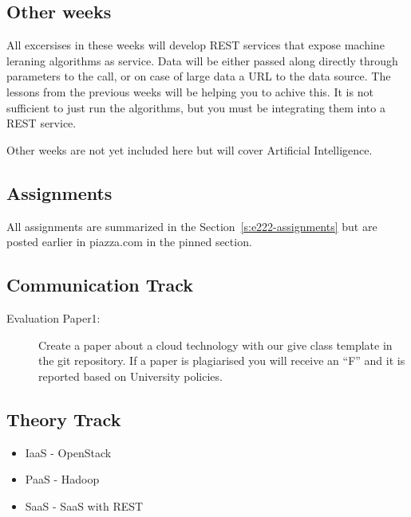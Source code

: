 \subsection{Other weeks}

All excersises in these weeks will develop REST services that expose
machine leraning algorithms as service. Data will be either passed
along directly through parameters to the call, or on case of large
data a URL to the data source. The lessons from the previous weeks
will be helping you to achive this. It is not sufficient to just run
the algorithms, but you must be integrating them into a REST service.

Other weeks are not yet included here but will cover Artificial
Intelligence.

\subsection{Assignments}

All assignments are summarized in the Section~\ref{s:e222-assignments}
but are posted earlier in piazza.com in the pinned section.


\subsection{Communication Track}




\begin{description}
\item[Evaluation Paper1:] Create a paper about a cloud technology with
  our give class template in the git repository. If a paper is
  plagiarised you will receive an ``F'' and it is reported based on
  University policies.
\end{description}

\subsection{Theory Track}

\begin{itemize}
\item IaaS - OpenStack
\item PaaS - Hadoop
\item SaaS - SaaS with REST
\end{itemize}


